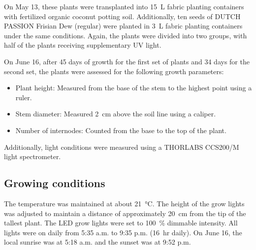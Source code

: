 On May 13, these plants were transplanted into \qty[mode=text]{15}{\L} fabric planting containers with fertilized organic coconut potting soil. Additionally, ten seeds of DUTCH PASSION Frisian Dew (regular) were planted in \qty[mode=text]{3}{\L} fabric planting containers under the same conditions. Again, the plants were divided into two groups, with half of the plants receiving supplementary UV light.

On June 16, after \num[mode=text]{45} days of growth for the first set of plants and \num[mode=text]{34} days for the second set, the plants were assessed for the following growth parameters:
\begin{itemize}
    \item Plant height: Measured from the base of the stem to the highest point using a ruler.
    \item Stem diameter: Measured \qty[mode=text]{2}{\cm} above the soil line using a caliper.
    \item Number of internodes: Counted from the base to the top of the plant.
\end{itemize}

Additionally, light conditions were measured using a THORLABS CCS200/M light spectrometer.

\subsection{Growing conditions}

The temperature was maintained at about \qty[mode=text]{21}{\degreeCelsius}. The height of the grow lights was adjusted to maintain a distance of approximately \qty[mode=text]{20}{\cm} from the tip of the tallest plant. The LED grow lights were set to \qty[mode=text]{100}{\percent} dimmable intensity. All lights were on daily from 5:35 a.m. to 9:35 p.m. (\qty[mode=text]{16}{hr} daily). On June 16, the local sunrise was at 5:18 a.m. and the sunset was at 9:52 p.m.